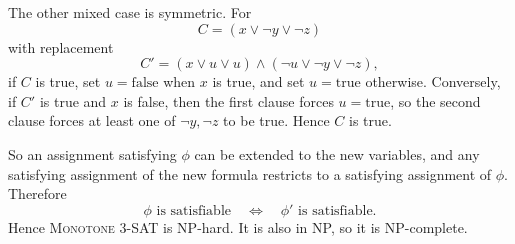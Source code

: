 {The other mixed case is symmetric. For
\[
C=(x\vee \neg y\vee \neg z)
\]
with replacement
\[
C'=(x\vee u\vee u)\wedge(\neg u\vee \neg y\vee \neg z),
\]
if $C$ is true, set $u=\mathrm{false}$ when $x$ is true, and set
$u=\mathrm{true}$ otherwise. Conversely, if $C'$ is true and $x$ is false, then
the first clause forces $u=\mathrm{true}$, so the second clause forces at least
one of $\neg y,\neg z$ to be true. Hence $C$ is true.

So an assignment satisfying $\phi$ can be extended to the new variables, and any
satisfying assignment of the new formula restricts to a satisfying assignment of
$\phi$. Therefore
\[
\phi\text{ is satisfiable}
\quad\Longleftrightarrow\quad
\phi'\text{ is satisfiable}.
\]
Hence \textsc{Monotone 3-SAT} is NP-hard. It is also in NP, so it is
NP-complete.
}

\newpage

